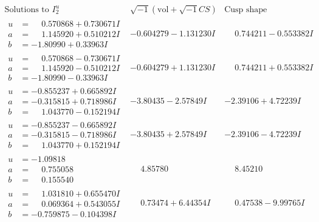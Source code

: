 \documentclass[1p]{elsarticle_modified}
\theoremstyle{definition}
\newcommand{\I}{\sqrt{-1}}
\begin{document}
$$\begin{array}{c|c|c}  
\text{Solutions to }I^u_{2}& \I (\text{vol} + \sqrt{-1}CS) & \text{Cusp shape}\\
 \hline 
\begin{aligned}
u &= \phantom{-}0.570868 + 0.730671 I \\
a &= \phantom{-}1.145920 + 0.510212 I \\
b &= -1.80990 + 0.33963 I\end{aligned}
 & -0.604279 - 1.131230 I & \phantom{-}0.744211 - 0.553382 I \\ \hline\begin{aligned}
u &= \phantom{-}0.570868 - 0.730671 I \\
a &= \phantom{-}1.145920 - 0.510212 I \\
b &= -1.80990 - 0.33963 I\end{aligned}
 & -0.604279 + 1.131230 I & \phantom{-}0.744211 + 0.553382 I \\ \hline\begin{aligned}
u &= -0.855237 + 0.665892 I \\
a &= -0.315815 + 0.718986 I \\
b &= \phantom{-}1.043770 - 0.152194 I\end{aligned}
 & -3.80435 - 2.57849 I & -2.39106 + 4.72239 I \\ \hline\begin{aligned}
u &= -0.855237 - 0.665892 I \\
a &= -0.315815 - 0.718986 I \\
b &= \phantom{-}1.043770 + 0.152194 I\end{aligned}
 & -3.80435 + 2.57849 I & -2.39106 - 4.72239 I \\ \hline\begin{aligned}
u &= -1.09818\phantom{ +0.000000I} \\
a &= \phantom{-}0.755058\phantom{ +0.000000I} \\
b &= \phantom{-}0.155540\phantom{ +0.000000I}\end{aligned}
 & \phantom{-}4.85780\phantom{ +0.000000I} & \phantom{-}8.45210\phantom{ +0.000000I} \\ \hline\begin{aligned}
u &= \phantom{-}1.031810 + 0.655470 I \\
a &= \phantom{-}0.069364 + 0.543055 I \\
b &= -0.759875 - 0.104398 I\end{aligned}
 & \phantom{-}0.73474 + 6.44354 I & \phantom{-}0.47538 - 9.99765 I \\ \hline\begin{aligned}

\end{aligned}
\end{array}$$
\end{document}
